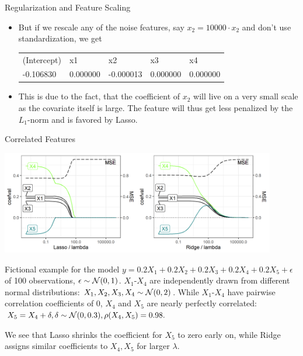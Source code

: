 \begin{vbframe}{Regularization and Feature Scaling}
\begin{itemize}
\normalsize
\item But if we rescale any of the noise features, say $x_2 = 10000 \cdot x_2$ and don't use standardization, we get
\footnotesize
\vspace{0.2cm}

\begin{table}[]
\begin{tabular}{lllll}
(Intercept) & x1       & x2        & x3       & x4       \\
-0.106830   & 0.000000 & -0.000013 & 0.000000 & 0.000000         
\end{tabular}
\end{table}

\normalsize

\item This is due to the fact, that the coefficient of $x_2$ will live on a very small scale as the covariate itself is large. The feature will thus get less penalized by the $L_1$-norm and is favored by Lasso.
\end{itemize}

\end{vbframe}

\begin{vbframe}{Correlated Features}


\includegraphics[width=0.9\textwidth]{figure_man/regu_example_multicollinearity.png}

Fictional example for the model $y = 0.2X_1 + 0.2X_2 + 0.2X_3 + 0.2X_4 + 0.2X_5 + \epsilon$ of 100 observations, $\epsilon \sim \mathcal{N} (0,1)$. $X_1$-$X_4$ are independently drawn from different normal distributions: $X_1, X_2, X_3, X_4 \sim \mathcal{N} (0,2)$. While $X_1$-$X_4$ have pairwise correlation coefficients of 0, $X_4$ and $X_5$ are nearly perfectly correlated: $X_5 = X_4 + \delta, \delta \sim \mathcal{N} (0,0.3), \rho(X_4, X_5) = 0.98. $

\vspace{0.1cm}

We see that Lasso shrinks the coefficient for $X_5$ to zero early on, while Ridge assigns similar coefficients to $X_4, X_5$ for larger $\lambda$.

\end{vbframe}


